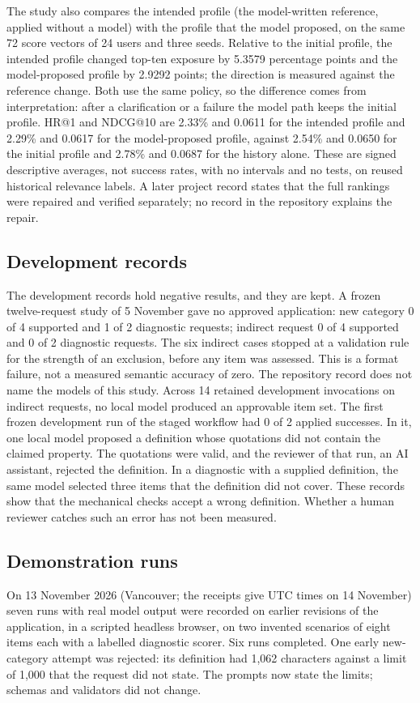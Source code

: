 \documentclass[conference]{IEEEtran}
\begin{document}
The study also compares the intended profile (the model-written reference, applied without a model) with the profile that the model proposed, on the same 72 score vectors of 24 users and three seeds. Relative to the initial profile, the intended profile changed top-ten exposure by 5.3579 percentage points and the model-proposed profile by 2.9292 points; the direction is measured against the reference change. Both use the same policy, so the difference comes from interpretation: after a clarification or a failure the model path keeps the initial profile. HR@1 and NDCG@10 are 2.33\% and 0.0611 for the intended profile and 2.29\% and 0.0617 for the model-proposed profile, against 2.54\% and 0.0650 for the initial profile and 2.78\% and 0.0687 for the history alone. These are signed descriptive averages, not success rates, with no intervals and no tests, on reused historical relevance labels. A later project record states that the full rankings were repaired and verified separately; no record in the repository explains the repair.

\subsection{Development records}
The development records hold negative results, and they are kept. A frozen twelve-request study of 5 November gave no approved application: new category 0 of 4 supported and 1 of 2 diagnostic requests; indirect request 0 of 4 supported and 0 of 2 diagnostic requests. The six indirect cases stopped at a validation rule for the strength of an exclusion, before any item was assessed. This is a format failure, not a measured semantic accuracy of zero. The repository record does not name the models of this study. Across 14 retained development invocations on indirect requests, no local model produced an approvable item set. The first frozen development run of the staged workflow had 0 of 2 applied successes. In it, one local model proposed a definition whose quotations did not contain the claimed property. The quotations were valid, and the reviewer of that run, an AI assistant, rejected the definition. In a diagnostic with a supplied definition, the same model selected three items that the definition did not cover. These records show that the mechanical checks accept a wrong definition. Whether a human reviewer catches such an error has not been measured.

\subsection{Demonstration runs}
On 13 November 2026 (Vancouver; the receipts give UTC times on 14 November) seven runs with real model output were recorded on earlier revisions of the application, in a scripted headless browser, on two invented scenarios of eight items each with a labelled diagnostic scorer. Six runs completed. One early new-category attempt was rejected: its definition had 1,062 characters against a limit of 1,000 that the request did not state. The prompts now state the limits; schemas and validators did not change.
\end{document}
